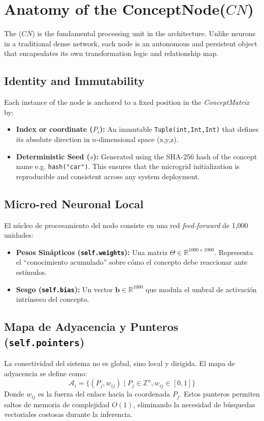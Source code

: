 \documentclass[12pt]{article}
\begin{document}
\section{Anatomy of the ConceptNode($CN$)}

The ($CN$) is the fundamental processing unit in the architecture. Unlike neurons in a traditional dense network,
each node is an autonomous and persistent object that encapsulates its own transformation logic and relationship map.

\subsection{Identity and Immutability}

Each instance of the node is anchored to a fixed position in the \textit{ConceptMatrix} by:
\begin{itemize}
    \item \textbf{Index or coordinate ($P_i$):} An immutable \texttt{Tuple(int,Int,Int)} that defines its absolute direction in $n$-dimensional space (x,y,z).
    \item \textbf{Deterministic Seed ($s$):} Generated using the SHA-256 hash of the concept name e.g. \texttt{hash("car")}. This ensures that the microgrid initialization is reproducible and consistent across any system deployment.
\end{itemize}

\subsection{Micro-red Neuronal Local }
El núcleo de procesamiento del nodo consiste en una red \textit{feed-forward} de 1,000 unidades:
\begin{itemize}
    \item \textbf{Pesos Sinápticos (\texttt{self.weights}):} Una matriz $\Theta \in \mathbb{R}^{1000 \times 1000}$. Representa el ``conocimiento acumulado'' sobre cómo el concepto debe reaccionar ante estímulos.
    \item \textbf{Sesgo (\texttt{self.bias}):} Un vector $\bm{b} \in \mathbb{R}^{1000}$ que modula el umbral de activación intrínseco del concepto.
\end{itemize}



\subsection{Mapa de Adyacencia y Punteros (\texttt{self.pointers})}
La conectividad del sistema no es global, sino local y dirigida. El mapa de adyacencia se define como:
\begin{equation}
    \mathcal{A}_i = \{ (P_j, w_{ij}) \mid P_j \in \mathbb{Z}^n, w_{ij} \in [0, 1] \}
\end{equation}
Donde $w_{ij}$ es la fuerza del enlace hacia la coordenada $P_j$. Estos punteros permiten saltos de memoria de complejidad $O(1)$, eliminando la necesidad de búsquedas vectoriales costosas durante la inferencia.
\end{document}
